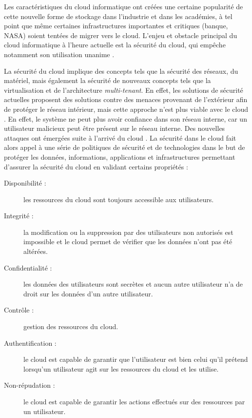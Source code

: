 Les caractéristiques du cloud informatique ont créées une certaine popularité de cette nouvelle forme de stockage dans l'industrie et dans les académies, à tel point que même certaines infrastructures importantes et critiques (banque, NASA) soient tentées de migrer vers le cloud. L'enjeu et obstacle principal du cloud informatique à l'heure actuelle est la sécurité du cloud, qui empêche notamment son utilisation unanime \cite{security_cloud_issues}.

La sécurité du cloud implique des concepts tels que la sécurité des réseaux, du
matériel, mais également la sécurité de nouveaux concepts tels que la
virtualisation et de l'architecture \textit{multi-tenant}. En effet, les
solutions de sécurité actuelles proposent des solutions contre des menaces
provenant de l'extérieur afin de protéger le réseau intérieur, mais cette
approche n'est plus viable avec le cloud \cite{defcon17} \cite{defcon20}. En
effet, le système ne peut plus avoir confiance dans son réseau interne, car un
utilisateur malicieux peut être présent sur le réseau interne. Des nouvelles
attaques ont émergées suite à l'arrivé du cloud \cite{new_attack_cloud}. La sécurité dans le cloud fait alors appel à une série de politiques de sécurité et de technologies dans le but de protéger les données, informations, applications et infrastructures permettant d'assurer la sécurité du cloud en validant certains propriétés :
\begin{description}
	\item[Disponibilité :] les ressources du cloud sont toujours accessible aux utilisateurs.
	\item[Integrité :] la modification ou la suppression par des utilisateurs non autorisés est impossible et le cloud permet de vérifier que les données n'ont pas été altérées.
	\item[Confidentialité :] les données des utilisateurs sont secrètes et aucun autre utilisateur n'a de droit sur les données d'un autre utilisateur.
	\item[Contrôle :] gestion des ressources du cloud.
	\item[Authentification :] le cloud est capable de garantir que l'utilisateur est bien celui qu'il prétend lorsqu'un utilisateur agit sur les ressources du cloud et les utilise.
	\item[Non-répudation :] le cloud est capable de garantir les actions effectués sur des ressources par un utilisateur.
\end{description}

